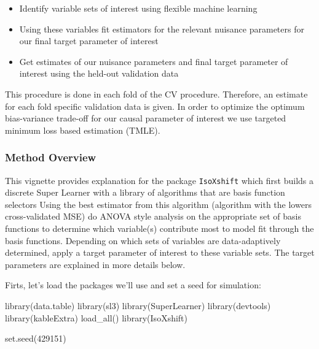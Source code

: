 \documentclass[
]{article}
\newenvironment{Shaded}{\begin{snugshade}}{\end{snugshade}}
\newcommand{\DecValTok}[1]{\textcolor[rgb]{0.00,0.00,0.81}{#1}}
\newcommand{\FunctionTok}[1]{\textcolor[rgb]{0.00,0.00,0.00}{#1}}
\newcommand{\NormalTok}[1]{#1}
\providecommand{\tightlist}{%
  \setlength{\itemsep}{0pt}\setlength{\parskip}{0pt}}
\begin{document}
\begin{itemize}
\tightlist
\item
  Identify variable sets of interest using flexible machine learning
\item
  Using these variables fit estimators for the relevant nuisance
  parameters for our final target parameter of interest
\item
  Get estimates of our nuisance parameters and final target parameter of
  interest using the held-out validation data
\end{itemize}

This procedure is done in each fold of the CV procedure. Therefore, an
estimate for each fold specific validation data is given. In order to
optimize the optimum bias-variance trade-off for our causal parameter of
interest we use targeted minimum loss based estimation (TMLE).

\hypertarget{method-overview}{%
\subsubsection{Method Overview}\label{method-overview}}

This vignette provides explanation for the package \texttt{IsoXshift}
which first builds a discrete Super Learner with a library of algorithms
that are basis function selectors Using the best estimator from this
algorithm (algorithm with the lowers cross-validated MSE) do ANOVA style
analysis on the appropriate set of basis functions to determine which
variable(s) contribute most to model fit through the basis functions.
Depending on which sets of variables are data-adaptively determined,
apply a target parameter of interest to these variable sets. The target
parameters are explained in more details below.

Firts, let's load the packages we'll use and set a seed for simulation:

\begin{Shaded}
\begin{Highlighting}[]
\FunctionTok{library}\NormalTok{(data.table)}
\FunctionTok{library}\NormalTok{(sl3)}
\FunctionTok{library}\NormalTok{(SuperLearner)}
\FunctionTok{library}\NormalTok{(devtools)}
\FunctionTok{library}\NormalTok{(kableExtra)}
\FunctionTok{load\_all}\NormalTok{()}
\FunctionTok{library}\NormalTok{(IsoXshift)}

\FunctionTok{set.seed}\NormalTok{(}\DecValTok{429151}\NormalTok{)}
\end{Highlighting}
\end{Shaded}
\end{document}
